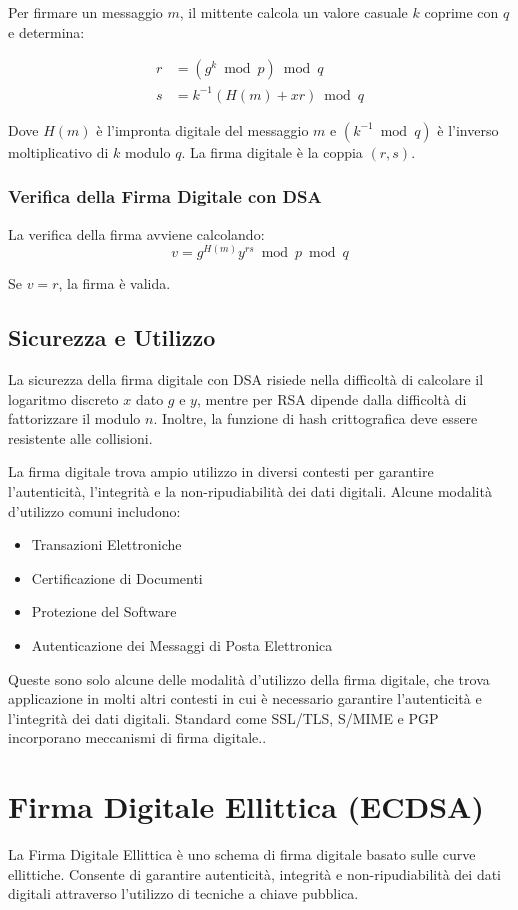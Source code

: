 \documentclass[a4paper,12pt]{report}
\begin{document}
Per firmare un messaggio $m$, il mittente calcola un valore casuale $k$ coprime con $q$ e determina:

\begin{align*}
r &= (g^k \bmod p) \bmod q \\
s &= k^{-1}(H(m) + xr) \bmod q
\end{align*}

Dove $H(m)$ è l'impronta digitale del messaggio $m$ e $(k^{-1} \bmod q)$ è l'inverso moltiplicativo di $k$ modulo $q$. La firma digitale è la coppia $(r, s)$.

\subsection*{Verifica della Firma Digitale con DSA}
La verifica della firma avviene calcolando:
\[v = g^{H(m)}y^{rs} \bmod p \bmod q\]

Se $v = r$, la firma è valida.

\section{Sicurezza e Utilizzo}
La sicurezza della firma digitale con DSA risiede nella difficoltà di calcolare il logaritmo discreto $x$ dato $g$ e $y$, mentre per RSA dipende dalla difficoltà di fattorizzare il modulo $n$. Inoltre, la funzione di hash crittografica deve essere resistente alle collisioni.

La firma digitale trova ampio utilizzo in diversi contesti per garantire l'autenticità, l'integrità e la non-ripudiabilità dei dati digitali. Alcune modalità d'utilizzo comuni includono:

\begin{itemize}
    \item Transazioni Elettroniche
    \item Certificazione di Documenti
    \item Protezione del Software
    \item Autenticazione dei Messaggi di Posta Elettronica
\end{itemize}

Queste sono solo alcune delle modalità d'utilizzo della firma digitale, che trova applicazione in molti altri contesti in cui è necessario garantire l'autenticità e l'integrità dei dati digitali. Standard come SSL/TLS, S/MIME e PGP incorporano meccanismi di firma digitale..
%
%
%
%
%
%
%
%
%
%
%
%

\chapter{Firma Digitale Ellittica (ECDSA)}
La Firma Digitale Ellittica è uno schema di firma digitale basato sulle curve ellittiche. Consente di garantire autenticità, integrità e non-ripudiabilità dei dati digitali attraverso l'utilizzo di tecniche a chiave pubblica.
\end{document}
